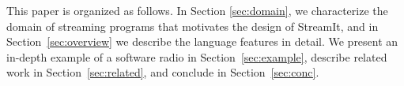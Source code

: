 This paper is organized as follows. In Section {\ref{sec:domain}}, we
characterize the domain of streaming programs that motivates the
design of StreamIt, and in Section~\ref{sec:overview} we describe the
language features in detail.  We present an in-depth example of a
software radio in Section~\ref{sec:example}, describe related work in
Section~\ref{sec:related}, and conclude in Section~\ref{sec:conc}.


